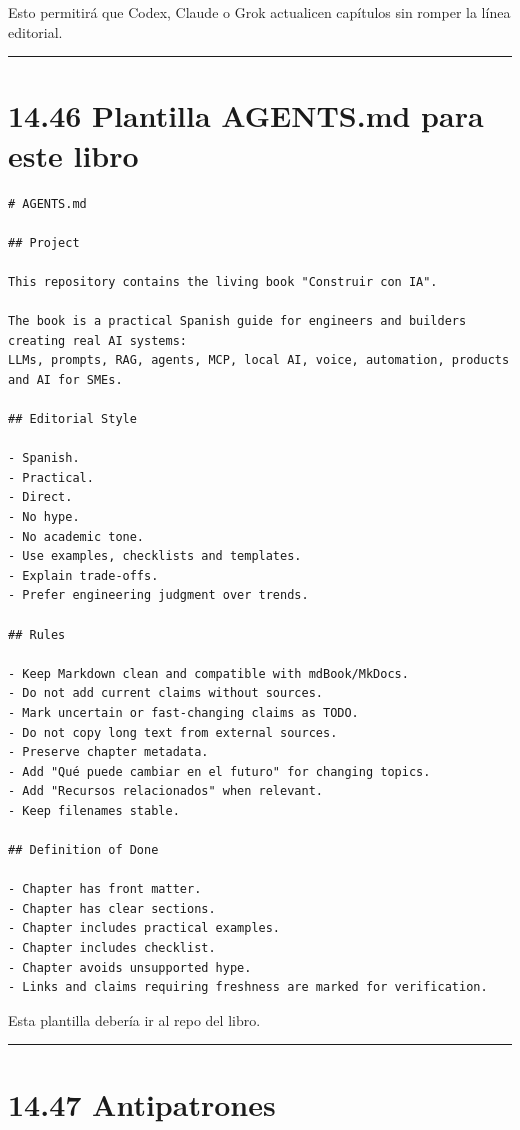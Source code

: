 Esto permitirá que Codex, Claude o Grok actualicen capítulos sin romper
la línea editorial.

\begin{center}\rule{0.5\linewidth}{0.5pt}\end{center}

\section{14.46 Plantilla AGENTS.md para este
libro}\label{plantilla-agents.md-para-este-libro}

\begin{lstlisting}
# AGENTS.md

## Project

This repository contains the living book "Construir con IA".

The book is a practical Spanish guide for engineers and builders creating real AI systems:
LLMs, prompts, RAG, agents, MCP, local AI, voice, automation, products and AI for SMEs.

## Editorial Style

- Spanish.
- Practical.
- Direct.
- No hype.
- No academic tone.
- Use examples, checklists and templates.
- Explain trade-offs.
- Prefer engineering judgment over trends.

## Rules

- Keep Markdown clean and compatible with mdBook/MkDocs.
- Do not add current claims without sources.
- Mark uncertain or fast-changing claims as TODO.
- Do not copy long text from external sources.
- Preserve chapter metadata.
- Add "Qué puede cambiar en el futuro" for changing topics.
- Add "Recursos relacionados" when relevant.
- Keep filenames stable.

## Definition of Done

- Chapter has front matter.
- Chapter has clear sections.
- Chapter includes practical examples.
- Chapter includes checklist.
- Chapter avoids unsupported hype.
- Links and claims requiring freshness are marked for verification.
\end{lstlisting}

Esta plantilla debería ir al repo del libro.

\begin{center}\rule{0.5\linewidth}{0.5pt}\end{center}

\section{14.47 Antipatrones}\label{antipatrones-3}

